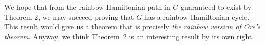 \bigskip

We hope that from the rainbow Hamiltonian path in $G$ guaranteed to
exist by Theorem 2, we may succeed proving that $G$ has a
rainbow Hamiltonian cycle. This result would give us a theorem that is
precisely \emph{the rainbow version of Ore's theorem}. Anyway, we
think Theorem~2 is an interesting result by its own right.
